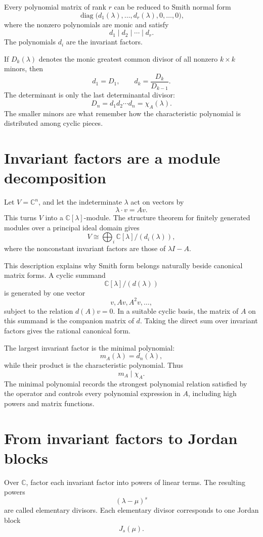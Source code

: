 Every polynomial matrix of rank \(r\) can be reduced to Smith normal form
\[
  \operatorname{diag}
  \bigl(d_1(\lambda),\ldots,d_r(\lambda),0,\ldots,0\bigr),
\]
where the nonzero polynomials are monic and satisfy
\[
  d_1\mid d_2\mid\cdots\mid d_r.
\]
The polynomials \(d_i\) are the invariant factors.

If \(D_k(\lambda)\) denotes the monic greatest common divisor of all nonzero \(k\times k\) minors, then
\[
  d_1=D_1,
  \qquad
  d_k=\frac{D_k}{D_{k-1}}.
\]
The determinant is only the last determinantal divisor:
\[
  D_n=d_1d_2\cdots d_n=\chi_A(\lambda).
\]
The smaller minors are what remember how the characteristic polynomial is distributed among cyclic pieces.

\section{Invariant factors are a module decomposition}

Let \(V=\mathbb C^n\), and let the indeterminate \(\lambda\) act on vectors by
\[
  \lambda\cdot v=Av.
\]
This turns \(V\) into a \(\mathbb C[\lambda]\)-module.  The structure theorem for finitely generated modules over a principal ideal domain gives
\[
  V
  \cong
  \bigoplus_i
  \mathbb C[\lambda]/(d_i(\lambda)),
\]
where the nonconstant invariant factors are those of \(\lambda I-A\).

This description explains why Smith form belongs naturally beside canonical matrix forms.  A cyclic summand
\[
  \mathbb C[\lambda]/(d(\lambda))
\]
is generated by one vector
\[
  v,Av,A^2v,\ldots,
\]
subject to the relation \(d(A)v=0\).  In a suitable cyclic basis, the matrix of \(A\) on this summand is the companion matrix of \(d\).  Taking the direct sum over invariant factors gives the rational canonical form.

The largest invariant factor is the minimal polynomial:
\[
  m_A(\lambda)=d_n(\lambda),
\]
while their product is the characteristic polynomial.  Thus
\[
  m_A\mid\chi_A.
\]
The minimal polynomial records the strongest polynomial relation satisfied by the operator and controls every polynomial expression in \(A\), including high powers and matrix functions.

\section{From invariant factors to Jordan blocks}

Over \(\mathbb C\), factor each invariant factor into powers of linear terms.  The resulting powers
\[
  (\lambda-\mu)^s
\]
are called elementary divisors.  Each elementary divisor corresponds to one Jordan block
\[
  J_s(\mu).
\]

